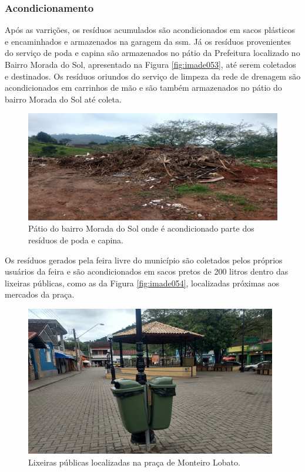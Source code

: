 	\subsubsection{Acondicionamento}
	
	Após as varrições, os resíduos acumulados são acondicionados em sacos plásticos e encaminhados e armazenados na garagem da \gls{ssm}.  Já os resíduos provenientes do serviço de poda e capina são armazenados no pátio da Prefeitura localizado no Bairro Morada do Sol, apresentado na Figura \ref{fig:imade053}, até serem coletados e destinados. Os resíduos oriundos do serviço de limpeza da rede de drenagem são acondicionados em carrinhos de mão e são também armazenados no pátio do bairro Morada do Sol até coleta.

	
	\begin{figure}
		\centering
		\includegraphics[width=0.75\linewidth]{produtos/prodtres/image053}
		\caption{Pátio do bairro Morada do Sol onde é acondicionado parte dos resíduos de poda e capina.}
		\label{fig:image053}
	\end{figure}
		
	Os resíduos gerados pela feira livre do município são coletados pelos próprios usuários da feira e são acondicionados em sacos pretos de 200 litros dentro das lixeiras públicas, como as da Figura \ref{fig:imade054}, localizadas próximas aos mercados da praça.

	\begin{figure}
		\centering
		\includegraphics[width=0.7\linewidth]{produtos/prodtres/image054}
		\caption{Lixeiras públicas localizadas na praça de Monteiro Lobato.}
		\label{fig:image054}
	\end{figure}
	
